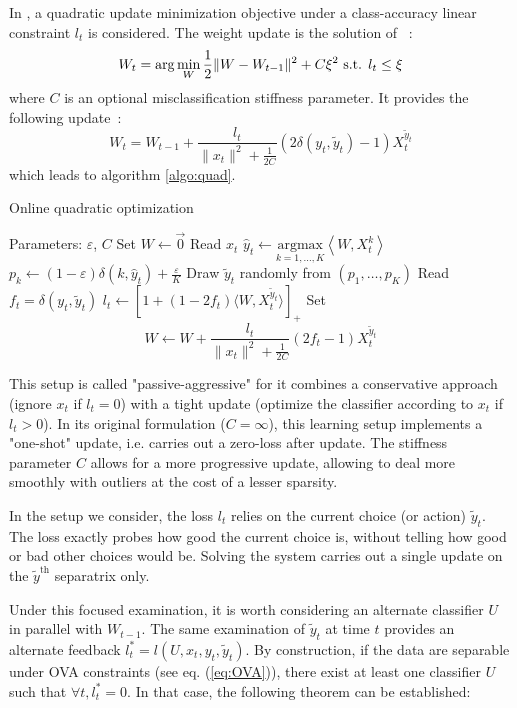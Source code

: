 \documentclass[preprint,12pt,authoryear]{elsarticle}
\begin{document}
In \cite{crammer2006online}, a quadratic update minimization objective under a class-accuracy linear constraint $ l_t $ is considered.  
The weight update is the solution of ~:
$$W_{t} = \arg \min_W \frac{1}{2} \| W - W_{t-1}\|^2 + C \xi^2 \hbox{ s.t. } l_t \leq \xi$$
where $C$ is an optional misclassification stiffness parameter. It provides the following update~:
$$W_{t} =  W_{t-1} + \frac{l_t}{\|x_t\|^2 + \frac{1}{2C}} (2\delta(y_t,\tilde{y}_t) - 1) X_t^{\tilde{y}_t}$$
which leads to algorithm \ref{algo:quad}.

\begin{algorithm}[t!]
	\caption{Online quadratic optimization}\label{algo:quad}
	\begin{algorithmic}
		\STATE Parameters:  $\varepsilon$, $C$
		\STATE Set $W \leftarrow \vec{0}$
		\STATE Read $x_t$
		\STATE $\hat{y}_t \leftarrow \underset{k = 1,\dots,K}{\text{argmax}}\left\langle W ,X_t^k\right\rangle$
		\STATE $p_{k}\leftarrow (1-\varepsilon)\delta(k,\hat{y}_t) + \frac{\varepsilon}{K}$
		\ENDFOR
		\STATE Draw $\tilde{y}_t$ randomly from $\left(p_{1},\dots ,p_{K}\right)$
		\STATE Read $f_t = \delta(y_t,\tilde{y}_t)$
		\STATE $l_t \leftarrow \left[ 1+(1-2f_t)\langle W,X_t^{\tilde{y}_t}\rangle\right]_{+}$ 
		\STATE Set $$W \leftarrow W + \frac{l_t}{\parallel x_t\parallel^2 + \frac{1}{2C}} (2f_t-1) X_t^{\tilde{y}_t}$$
		\ENDFOR
	\end{algorithmic}
\end{algorithm}

This setup is called "passive-aggressive" for it combines a conservative approach (ignore $x_t$ if $l_t=0$) with a tight update (optimize the classifier according to $x_t$ if $l_t>0$).
In its original formulation ($C = \infty$), this learning setup implements a "one-shot" update, i.e. carries out a zero-loss  after update. The stiffness parameter $C$ allows for a more progressive update, allowing to deal more smoothly with outliers at the cost of a lesser sparsity.

In the setup we consider, the loss $l_t$ relies on the current choice (or action) $\tilde{y}_t$. The loss exactly probes how good the current choice is, without telling how good or bad other choices would be. Solving the system carries out a single update on the  $\tilde{y}^\text{th}$ separatrix only. 

Under this focused examination, it is worth considering an alternate classifier $U$ in parallel with $W_{t-1}$. The same examination of $\tilde{y}_t$ at time $t$ provides an alternate feedback $l^*_t = l(U,x_t,y_t,\tilde{y}_t)$. By construction, if the data are separable under OVA constraints (see eq. (\ref{eq:OVA})), there exist at least one classifier $U$ such that $\forall t, l^*_t = 0$. In that case, the following theorem can be established:
\end{document}
